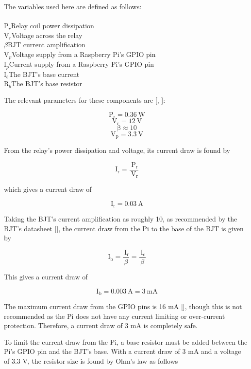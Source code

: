 \begin{minipage}{\textwidth}

The variables used here are defined as follows:
\\\\
P$_r$\dotfill Relay coil power dissipation\\
V$_r$\dotfill Voltage across the relay\\
$\beta$\dotfill BJT current amplification\\
V$_p$\dotfill Voltage supply from a Raspberry Pi's GPIO pin\\
I$_p$\dotfill Current supply from a Raspberry Pi's GPIO pin\\
I$_b$\dotfill The BJT's base current\\
R$_b$\dotfill The BJT's base resistor\\

\end{minipage}

The relevant  parameters for these components are [\cite{manual:relay-specs},
\cite{maunual:transistor-datasheet}]:

\[ \mathrm{\ P_{r}} = 0.36\mathrm{\ W}\]
\[ \mathrm{\ V_{r}} = 12\mathrm{\ V}\]
\[ \mathrm{\ \beta} \approx 10\]
\[ \mathrm{\ V_{p}} = 3.3\mathrm{\ V}\]

From the relay's power dissipation and voltage, its current draw is found by

\[
\mathrm{\ I_{r}} = \frac{\mathrm{\ P_{r}}}{\mathrm{\ V_{r}}}
\]

which gives a current draw of

\[
\mathrm{\ I_{r}} = 0.03\mathrm{\ A}
\]

Taking the BJT's current amplification as roughly 10, as recommended by the
BJT's datasheet [\cite{maunual:transistor-datasheet}], the current draw from the
Pi to the base of the BJT is given by

\[
\mathrm{\ I_{b}} = \frac{\mathrm{\ I_{r}}}{\beta} = \frac{\mathrm{\
I_{c}}}{\beta}
\]

This gives a current draw of

\[
\mathrm{\ I_{b}} = 0.003\mathrm{\ A} = 3\mathrm{\ mA}
\]

The maximum current draw from the GPIO pins is 16 mA
[\cite{website:gpio-specs}], though this is not recommended as the Pi does not
have any current limiting or over-current protection.
Therefore, a current draw of 3 mA is completely safe.

To limit the current draw from the Pi, a base resistor must be added between the Pi's GPIO pin
and the BJT's base. With a current draw of 3 mA and a voltage of 3.3 V, the
resistor size is found by Ohm's law as follows

